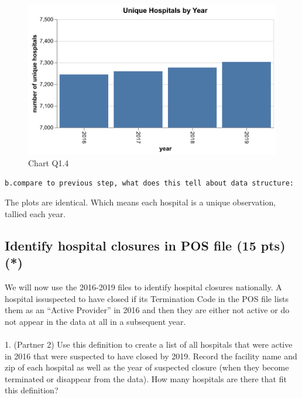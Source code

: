 \documentclass[
  letterpaper,
  DIV=11,
  numbers=noendperiod]{scrartcl}
\makeatletter
\let\oldparagraph\paragraph
\renewcommand{\paragraph}{
    \@ifstar
      \xxxParagraphStar
      \xxxParagraphNoStar
  }
\newcommand{\xxxParagraphStar}[1]{\oldparagraph*{#1}\mbox{}}
\newcommand{\xxxParagraphNoStar}[1]{\oldparagraph{#1}\mbox{}}
\makeatother
\begin{document}
\begin{figure}[H]

{\centering \includegraphics{chartQ1_4.png}

}

\caption{Chart Q1.4}

\end{figure}%

\begin{verbatim}
b.compare to previous step, what does this tell about data structure:
\end{verbatim}

The plots are identical. Which means each hospital is a unique
observation, tallied each year.

\subsection{Identify hospital closures in POS file (15 pts)
(*)}\label{identify-hospital-closures-in-pos-file-15-pts}

We will now use the 2016-2019 files to identify hospital closures
nationally. A hospital issuspected to have closed if its Termination
Code in the POS file lists them as an ``Active Provider'' in 2016 and
then they are either not active or do not appear in the data at all in a
subsequent year.

\paragraph{1. (Partner 2) Use this definition to create a list of all
hospitals that were active in 2016 that were suspected to have closed by
2019. Record the facility name and zip of each hospital as well as the
year of suspected closure (when they become terminated or disappear from
the data). How many hospitals are there that fit this
definition?}\label{partner-2-use-this-definition-to-create-a-list-of-all-hospitals-that-were-active-in-2016-that-were-suspected-to-have-closed-by-2019.-record-the-facility-name-and-zip-of-each-hospital-as-well-as-the-year-of-suspected-closure-when-they-become-terminated-or-disappear-from-the-data.-how-many-hospitals-are-there-that-fit-this-definition}
\end{document}
